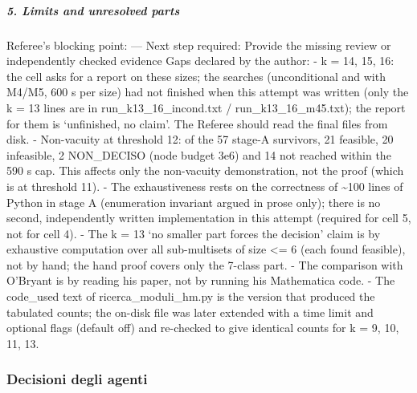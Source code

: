 \documentclass[11pt,a4paper]{article}
\begin{document}
\subparagraph{5. Limits and unresolved
parts}\label{limits-and-unresolved-parts}

Referee's blocking point: --- Next step required: Provide the missing
review or independently checked evidence Gaps declared by the author: -
k = 14, 15, 16: the cell asks for a report on these sizes; the searches
(unconditional and with M4/M5, 600 s per size) had not finished when
this attempt was written (only the k = 13 lines are in
run\_k13\_16\_incond.txt / run\_k13\_16\_m45.txt); the report for them
is `unfinished, no claim'. The Referee should read the final files from
disk. - Non-vacuity at threshold 12: of the 57 stage-A survivors, 21
feasible, 20 infeasible, 2 NON\_DECISO (node budget 3e6) and 14 not
reached within the 590 s cap. This affects only the non-vacuity
demonstration, not the proof (which is at threshold 11). - The
exhaustiveness rests on the correctness of \textasciitilde100 lines of
Python in stage A (enumeration invariant argued in prose only); there is
no second, independently written implementation in this attempt
(required for cell 5, not for cell 4). - The k = 13 `no smaller part
forces the decision' claim is by exhaustive computation over all
sub-multisets of size \textless= 6 (each found feasible), not by hand;
the hand proof covers only the 7-class part. - The comparison with
O'Bryant is by reading his paper, not by running his Mathematica code. -
The code\_used text of ricerca\_moduli\_hm.py is the version that
produced the tabulated counts; the on-disk file was later extended with
a time limit and optional flags (default off) and re-checked to give
identical counts for k = 9, 10, 11, 13.

\subsubsection{Decisioni degli agenti}
\end{document}
